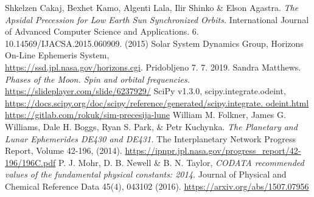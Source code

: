 \documentclass[a4paper,12pt]{article}
\begin{document}
\newpage
\begin{thebibliography}{1}
     Shkelzen Cakaj,  Bexhet Kamo, Algenti Lala,
    Ilir Shinko \& Elson Agastra. \textit{The Apsidal Precession for Low Earth 
    Sun Synchronized Orbits.} International Journal of Advanced Computer 
    Science and Applications. 6. 10.14569/IJACSA.2015.060909. (2015)
     Solar System Dynamics Group, 
    Horizons On-Line Ephemeris System, \\ 
    \url{https://ssd.jpl.nasa.gov/horizons.cgi}. Pridobljeno 7. 7. 2019.
     Sandra Matthews. \textit{Phases of the Moon. Spin and 
    orbital frequencies.} \\
    \url{https://slideplayer.com/slide/6237929/}
     SciPy v1.3.0, scipy.integrate.odeint,
    \url{https://docs.scipy.org/doc/scipy/reference/generated/scipy.integrate.
    odeint.html}
     \url{https://gitlab.com/rokuk/sim-precesija-lune}
     William M. Folkner, James G. Williams, Dale H. Boggs, 
    Ryan S. Park, \& Petr Kuchynka. \textit{The Planetary and Lunar Ephemerides 
    DE430 and DE431.} The Interplanetary Network Progress Report, Volume 42-196, 
    (2014). 
    \mbox{\url{https://ipnpr.jpl.nasa.gov/progress_report/42-196/196C.pdf}}
     P. J. Mohr, D. B. Newell \& B. N. Taylor, \textit{CODATA 
    recommended values of the fundamental physical constants: 2014.} Journal of 
    Physical and Chemical Reference Data 45(4), 043102 (2016).
    \url{https://arxiv.org/abs/1507.07956}
\end{thebibliography}
\end{document}
